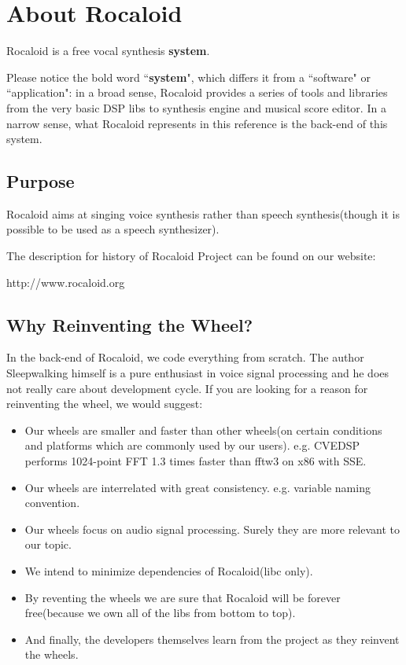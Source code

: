 \section{About Rocaloid}\indent

        Rocaloid is a free vocal synthesis \textbf{system}.
        
        Please notice the bold word ``\textbf{system}", which differs it from a ``software" or ``application": in a broad sense, Rocaloid provides a series of tools and libraries from the very basic DSP libs to synthesis engine and musical score editor. In a narrow sense, what Rocaloid represents in this reference is the back-end of this system.

\subsection{Purpose}\indent

        Rocaloid aims at singing voice synthesis rather than speech synthesis(though it is possible to be used as a speech synthesizer).
        
        The description for history of Rocaloid Project can be found on our website:
        
        http://www.rocaloid.org
        
\subsection{Why Reinventing the Wheel?}\indent

        In the back-end of Rocaloid, we code everything from scratch. The author Sleepwalking himself is a pure enthusiast in voice signal processing and he does not really care about development cycle. If you are looking for a reason for reinventing the wheel, we would suggest:
        
        \begin{itemize}
                \item Our wheels are smaller and faster than other wheels(on certain conditions and platforms which are commonly used by our users). e.g. CVEDSP performs 1024-point FFT 1.3 times faster than fftw3 on x86 with SSE.
                \item Our wheels are interrelated with great consistency. e.g. variable naming convention.
                \item Our wheels focus on audio signal processing. Surely they are more relevant to our topic.
                \item We intend to minimize dependencies of Rocaloid(libc only).
                \item By reventing the wheels we are sure that Rocaloid will be forever free(because we own all of the libs from bottom to top).
                \item And finally, the developers themselves learn from the project as they reinvent the wheels.
        \end{itemize}

